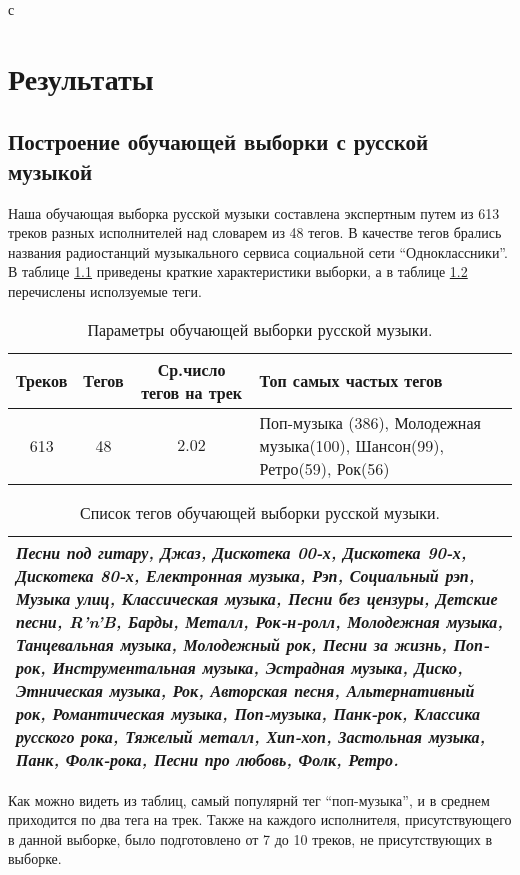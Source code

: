 с\chapter{Результаты} 
\label{results}

\section{Построение обучающей выборки с русской музыкой}

Наша обучающая выборка русской музыки составлена экспертным путем из 613 треков разных исполнителей над словарем из 48 тегов. 
В качестве тегов брались названия радиостанций музыкального сервиса социальной сети ``Одноклассники''.
В таблице \ref{tab:rus_dataset} приведены краткие характеристики выборки, а в таблице \ref{tab:tags} перечислены исползуемые теги.
\begin{table}[ht]
\centering
\captionsetup{justification=centering}
\caption{Параметры обучающей выборки русской музыки.}
\label{tab:rus_dataset}
\begin{tabular}{ |c c c p{5cm}| }
  \hline    
  Треков & Тегов & Ср.число тегов на трек & Топ самых частых тегов \\  
  \hline    
  613 & 48 & $2.02$ & 
  Поп-музыка (386), Молодежная музыка(100), Шансон(99), Ретро(59), Рок(56) \\  
  \hline    
\end{tabular}
\end{table}

\begin{table}[ht]
\centering
\captionsetup{justification=centering}
\caption{Список тегов обучающей выборки русской музыки.}
\label{tab:tags}
\begin{tabular}{ |p{15cm}| }
  \hline    
  \emph{Песни под гитару, Джаз, Дискотека 00-х, Дискотека 90-х, Дискотека 80-х, Електронная музыка,
Рэп, Социальный рэп, Музыка улиц, Классическая музыка, Песни без цензуры, Детские песни, R'n'B, Барды, Металл, Рок-н-ролл,
Молодежная музыка, Танцевальная музыка, Молодежный рок, Песни за жизнь, Поп-рок, Инструментальная музыка, Эстрадная музыка,
Диско, Этническая музыка, Рок, Авторская песня, Альтернативный рок, Романтическая музыка, Поп-музыка, Панк-рок,
Классика русского рока, Тяжелый металл, Хип-хоп, Застольная музыка, Панк, Фолк-рока, Песни про любовь, Фолк, Ретро.}\\
\hline    
\end{tabular}
\end{table}
Как можно видеть из таблиц, самый популярнй тег \ld ``поп-музыка'', и в среднем приходится по два тега на трек.
Также на каждого исполнителя, присутствующего в данной выборке, было подготовлено от 7 до 10 треков, не присутствующих в выборке.

